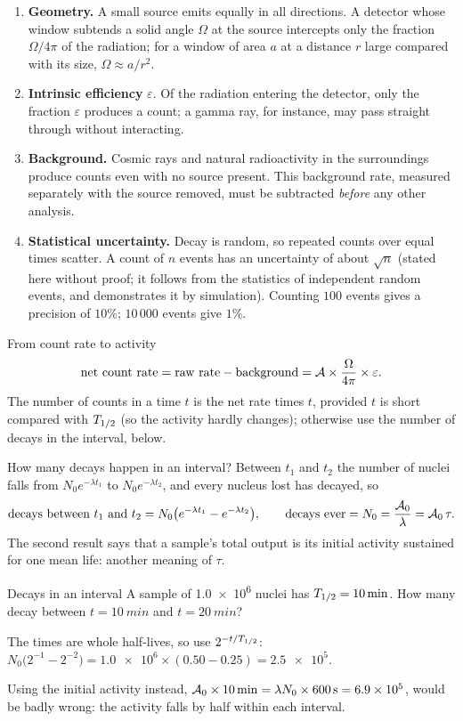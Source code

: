 \begin{enumerate}[label=\textbf{(\arabic*)}]
\item \textbf{Geometry.} A small source emits equally in all directions. A detector whose window
subtends a solid angle $\Omega$ at the source intercepts only the fraction $\Omega/4\pi$ of the
radiation; for a window of area $a$ at a distance $r$ large compared with its size, $\Omega\approx a/r^2$.
\item \textbf{Intrinsic efficiency} $\varepsilon$. Of the radiation entering the detector, only the
fraction $\varepsilon$ produces a count; a gamma ray, for instance, may pass straight through without
interacting.
\item \textbf{Background.} Cosmic rays and natural radioactivity in the surroundings produce counts even
with no source present. This background rate, measured separately with the source removed, must be
subtracted \emph{before} any other analysis.
\item \textbf{Statistical uncertainty.} Decay is random, so repeated counts over equal times scatter. A
count of $n$ events has an uncertainty of about $\sqrt n$ (stated here without proof; it follows from
the statistics of independent random events, and  demonstrates it by simulation).
Counting $100$ events gives a precision of $10\%$; $10\,000$ events give $1\%$.
\end{enumerate}

\begin{keybox}{From count rate to activity}
\[
\text{net count rate}=\text{raw rate}-\text{background}=\mathcal{A}\times\frac{\Omega}{4\pi}\times\varepsilon .
\]
The number of counts in a time $t$ is the net rate times $t$, provided $t$ is short compared with
$T_{1/2}$ (so the activity hardly changes); otherwise use the number of decays in the interval, below.
\end{keybox}

How many decays happen in an interval? Between $t_1$ and $t_2$ the number of nuclei falls from
$N_0e^{-\lambda t_1}$ to $N_0e^{-\lambda t_2}$, and every nucleus lost has decayed, so
\[
\text{decays between }t_1\text{ and }t_2=N_0\big(e^{-\lambda t_1}-e^{-\lambda t_2}\big),\qquad
\text{decays ever}=N_0=\frac{\mathcal{A}_0}{\lambda}=\mathcal{A}_0\,\tau .
\]
The second result says that a sample's total output is its initial activity sustained for one mean
life: another meaning of $\tau$.

\begin{exbox}{Decays in an interval}
A sample of \num{1.0e6} nuclei has $T_{1/2}=\SI{10}{min}$. How many decay between $t=\SI{10}{min}$
and $t=\SI{20}{min}$?

 The times are whole half-lives, so use $2^{-t/T_{1/2}}$: $N_0\big(2^{-1}-2^{-2}\big)=\num{1.0e6}\times(0.50-0.25)=\num{2.5e5}$.

Using the initial activity instead, $\mathcal{A}_0\times\SI{10}{min}=\lambda N_0\times\SI{600}{s}=\num{6.9e5}$,
would be badly wrong: the activity falls by half within each interval.
\end{exbox}

